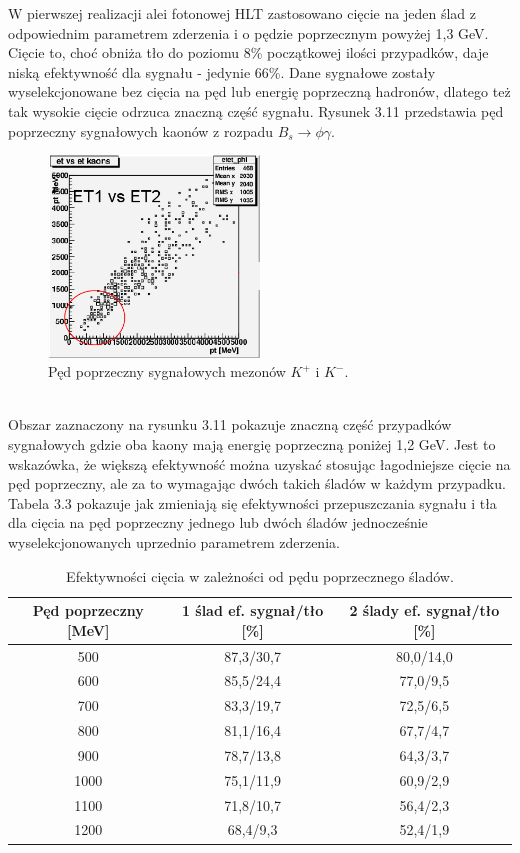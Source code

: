\documentclass{pracamgr}
\begin{document}
\noindent
W pierwszej realizacji alei fotonowej HLT zastosowano cięcie na jeden ślad z odpowiednim parametrem zderzenia i o pędzie poprzecznym powyżej 1,3 GeV. Cięcie to, choć obniża tło do poziomu 8\% początkowej ilości przypadków, daje niską efektywność dla sygnału - jedynie 66\%. Dane sygnałowe zostały wyselekcjonowane bez cięcia na pęd lub energię poprzeczną hadronów, dlatego też tak wysokie cięcie odrzuca znaczną część sygnału. Rysunek 3.11 przedstawia pęd poprzeczny sygnałowych kaonów z rozpadu $B_s\rightarrow \phi\gamma$. \\
\begin{figure}[!h]
 \centering
 \includegraphics[width=0.5\textwidth]{rysunki/etet.png}
 \caption{Pęd poprzeczny sygnałowych mezonów $K^{+}$ i $K^{-}$.}
\end{figure}
\\
\noindent
Obszar zaznaczony na rysunku 3.11 pokazuje znaczną część przypadków sygnałowych gdzie oba kaony mają energię poprzeczną poniżej 1,2 GeV. Jest to wskazówka, że większą efektywność można uzyskać stosując łagodniejsze cięcie na pęd poprzeczny, ale za to wymagając dwóch takich śladów w każdym przypadku. Tabela 3.3 pokazuje jak zmieniają się efektywności przepuszczania sygnału i tła dla cięcia na pęd poprzeczny jednego lub dwóch śladów jednocześnie wyselekcjonowanych uprzednio parametrem zderzenia.
\begin{table}[!h]
 \centering
 \begin{tabular}{|c|c|c|}
  \hline
  Pęd poprzeczny [MeV] & 1 ślad ef. sygnał/tło [\%] & 2 ślady ef. sygnał/tło [\%] \\
  \hline
   500 &  87,3/30,7 & 80,0/14,0 \\
  \hline
   600 & 85,5/24,4 & 77,0/9,5 \\
  \hline
   700 & 83,3/19,7 & 72,5/6,5 \\
  \hline
   800 & 81,1/16,4 & 67,7/4,7\\
  \hline
   900 & 78,7/13,8 & 64,3/3,7\\
  \hline
  1000 & 75,1/11,9 & 60,9/2,9 \\
  \hline 
  1100 & 71,8/10,7 & 56,4/2,3 \\
  \hline 
  1200 & 68,4/9,3 & 52,4/1,9 \\
  \hline
 \end{tabular}
 \caption{Efektywności cięcia w zależności od pędu poprzecznego śladów.}
\end{table}
\end{document}
